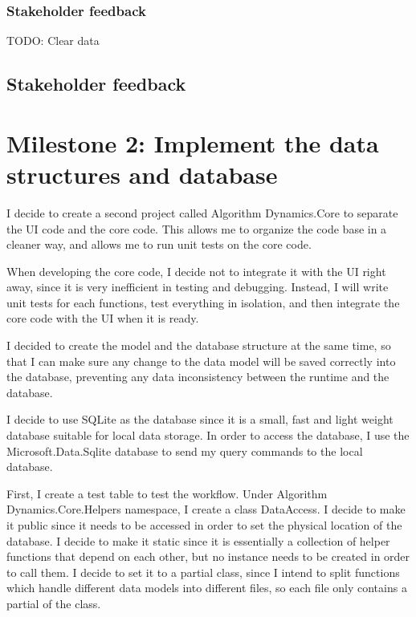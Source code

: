 \documentclass[a4paper]{report}
\begin{document}
\subsubsection{Stakeholder feedback}

TODO: Clear data

\subsection{Stakeholder feedback}



\section{Milestone 2: Implement the data structures and database}

I decide to create a second project called Algorithm Dynamics.Core to separate the UI code and the core code. This allows me to organize the code base in a cleaner way, and allows me to run unit tests on the core code.

When developing the core code, I decide not to integrate it with the UI right away, since it is very inefficient in testing and debugging. Instead, I will write unit tests for each functions, test everything in isolation, and then integrate the core code with the UI when it is ready.

I decided to create the model and the database structure at the same time, so that I can make sure any change to the data model will be saved correctly into the database, preventing any data inconsistency between the runtime and the database.

I decide to use SQLite\cite{sqlite} as the database since it is a small, fast and light weight database suitable for local data storage. In order to access the database, I use the Microsoft.Data.Sqlite\cite{microsoft:docs:sqlite} database to send my query commands to the local database.

First, I create a test table to test the workflow. Under Algorithm Dynamics.Core.Helpers namespace, I create a class DataAccess. I decide to make it public since it needs to be accessed in order to set the physical location of the database. I decide to make it static since it is essentially a collection of helper functions that depend on each other, but no instance needs to be created in order to call them. I decide to set it to a partial class, since I intend to split functions which handle different data models into different files, so each file only contains a partial of the class.
\end{document}
